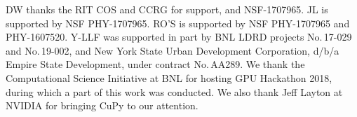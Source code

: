 \documentclass[twocolumn,prd,nofootinbib]{revtex4}
\begin{document}
\begin{acknowledgements}
DW thanks the RIT COS and CCRG for support, and  NSF-1707965.
JL is supported by NSF PHY-1707965.  
RO'S is supported by NSF PHY-1707965 and PHY-1607520.
Y-LLF was supported in part by BNL LDRD projects No.\,17-029 and No.\,19-002, 
and New York State Urban Development Corporation, d/b/a Empire State Development, under contract No.\,AA289.
We thank the Computational Science Initiative at BNL for hosting GPU Hackathon 2018, during which a part of this work was conducted. We also thank Jeff Layton at NVIDIA for bringing CuPy to our attention.
\end{acknowledgements}



\end{document}
